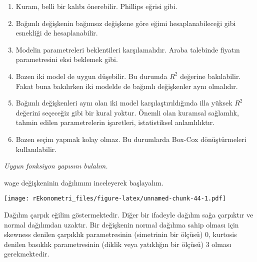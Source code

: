 \documentclass[
]{book}
\newenvironment{Shaded}{\begin{snugshade}}{\end{snugshade}}
\newcommand{\DataTypeTok}[1]{\textcolor[rgb]{0.13,0.29,0.53}{#1}}
\newcommand{\KeywordTok}[1]{\textcolor[rgb]{0.13,0.29,0.53}{\textbf{#1}}}
\newcommand{\NormalTok}[1]{#1}
\newcommand{\OperatorTok}[1]{\textcolor[rgb]{0.81,0.36,0.00}{\textbf{#1}}}
\newcommand{\StringTok}[1]{\textcolor[rgb]{0.31,0.60,0.02}{#1}}
\begin{document}
\begin{enumerate}
\def\labelenumi{\roman{enumi}.}
\item
  Kuram, belli bir kalıbı önerebilir. Phillips eğrisi gibi.
\item
  Bağımlı değişkenin bağımsız değişkene göre eğimi hesaplanabileceği gibi esnekliği de hesaplanabilir.
\item
  Modelin parametreleri beklentileri karşılamalıdır. Araba talebinde fiyatın parametresini eksi beklemek gibi.
\item
  Bazen iki model de uygun düşebilir. Bu durumda \(R^2\) değerine bakılabilir. Fakat buna bakılırken iki modelde de bağımlı değişkenler aynı olmalıdır.
\item
  Bağımlı değişkenleri aynı olan iki model karşılaştırıldığında illa yüksek \(R^2\) değerini seçeceğiz gibi bir kural yoktur. Önemli olan kuramsal sağlamlık, tahmin edilen parametrelerin işaretleri, istatistiksel anlamlılıktır.
\item
  Bazen seçim yapmak kolay olmaz. Bu durumlarda Box-Cox dönüştürmeleri kullanılabilir.
\end{enumerate}

\emph{Uygun fonksiyon yapısını bulalım.}

wage değişkeninin dağılımını inceleyerek başlayalım.

\begin{Shaded}
\end{Shaded}

\texttt{[image: rEkonometri\_files/figure-latex/unnamed-chunk-44-1.pdf]}

Dağılım çarpık eğilim göstermektedir. Diğer bir ifadeyle dağılım sağa çarpıktır ve normal dağılımdan uzaktır. Bir değişkenin normal dağılıma sahip olması için skewness denilen çarpıklık parametresinin (simetrinin bir ölçüsü) 0, kurtosis denilen basıklık parametresinin (diklik veya yatıklığın bir ölçüsü) 3 olması gerekmektedir.
\end{document}
